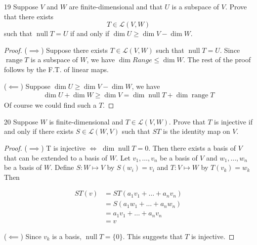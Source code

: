 \documentclass{extarticle}
\newenvironment{problem}[1]{\begin{prob*}{#1}{}}{\end{prob*}}
\newcommand{\Hom}{\mathcal{L}}
\DeclareMathOperator{\Null}{null}
\DeclareMathOperator{\Range}{range}
\begin{document}
\begin{problem}{19}
Suppose $V$ and $W$ are finite-dimensional and that $U$ is a subspace of $V$. Prove that there exists \[T \in \Hom(V,W)\] such that \(\Null T = U\) if and only if \(\dim U \geq \dim V - \dim W\).
\end{problem}

\begin{proof}
($\implies$) Suppose there exists \(T \in \Hom(V,W)\) such that \(\Null T = U\). Since \(\Range T\) is a subspace of $W$, we have \(\dim Range \leq \dim W\). The rest of the proof follows by the F.T. of linear maps.

($\impliedby$) Suppose \(\dim U \geq \dim V - \dim W\), we have
\begin{align}
  \dim U + \dim W \geq \dim V = \dim \Null T + \dim \Range T
\end{align}
Of course we could find such a $T$.
\end{proof}

\begin{problem}{20}
Suppose $W$ is finite-dimensional and \(T \in \Hom(V,W)\). Prove that $T$ is injective if and only if there exists \(S \in \Hom (W,V)\) such that $ST$ is the identity map on $V$.
\end{problem}

\begin{proof}
($\implies$) T is injective $\iff$ \(\dim \Null T = 0\). Then there exists a basis of $V$ that can be extended to a basis of $W$. Let $v_1, \dots, v_n$ be a basis of $V$ and $w_1, \dots, w_n$ be a basis of $W$. Define $S: W \mapsto V$ by \(S(w_i) = v_i\) and \(T: V \mapsto W\) by \(T(v_k) = w_k\) Then

\begin{align}
  ST(v) &= ST(a_1 v_1 + \dots + a_n v_n) \\
  &= S(a_1 w_1 + \dots + a_n w_n) \\
  &= a_1 v_1 + \dots + a_n v_n \\
  &= v
\end{align}

($\impliedby$) Since $v_k$ is a basis, \(\Null T = \{0\}\). This suggests that $T$ is injective.
\end{proof}


\end{document}
